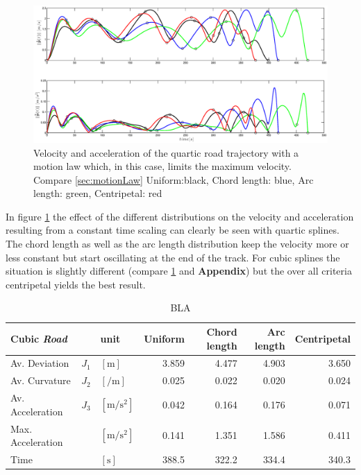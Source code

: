 \begin{figure}[H]
  \begin{minipage}[t]{0.96\textwidth}
    \includegraphics[width = \textwidth]{graphics/Parameterization4_road_vel_acc.eps}
  \end{minipage}
  \caption{Velocity and acceleration of the quartic road trajectory with a motion law which, in this case, limits the maximum velocity. Compare \ref{sec:motionLaw} Uniform:black, Chord length: blue, Arc length: green, Centripetal: red}
  \label{fig:para road vel acc}
\end{figure}

In figure \ref{fig:para road vel acc} the effect of the different distributions on the velocity and acceleration resulting from a constant time scaling can clearly be seen with quartic splines. The chord length as well as the arc length distribution keep the velocity more or less constant but start oscillating at the end of the track. For cubic splines the situation is slightly different (compare \ref{tab:results_parameterization_road_cubic} and {\bf Appendix}) but the over all criteria centripetal yields the best result.


\begin{table}[h]
\begin{center}
 \begin{tabular}{lll|rrrr}
 \hline
 Cubic \textit{Road} & & unit & Uniform & Chord length & Arc length & Centripetal \\ \hline \hline
 Av. Deviation  & $J_1$ & $[\si{\meter}]$    & 3.859 & 4.477 & 4.903 & 3.650 \\
 Av. Curvature & $J_2$ & $[\si{\per\meter}]$ & 0.025 & 0.022 & 0.020 & 0.024 \\
 Av. Acceleration  & $J_3$ & $[\si{\meter\per\square\second}]$ &  0.042 & 0.164 & 0.176 & 0.071 \\
 Max. Acceleration &   & $[\si{\meter\per\square\second}]$ &  0.141 & 1.351 & 1.586 & 0.411 \\
 Time      &   & $[\si{\second}]$ &  388.5 & 322.2 & 334.4 & 340.3 \\
 \hline
 \end{tabular}
 \caption{BLA}\vspace{1ex}
 \label{tab:results_parameterization_road_cubic}
\end{center}
\end{table}

